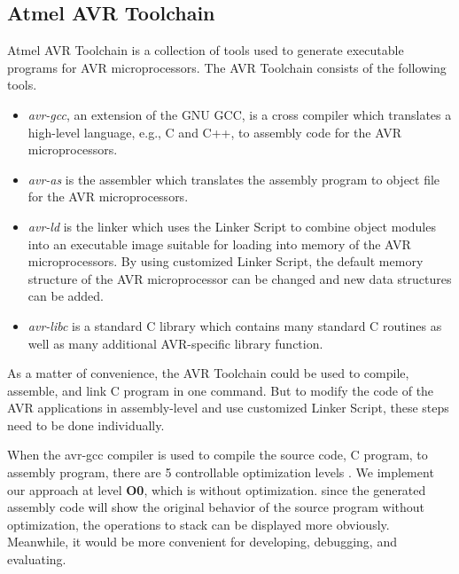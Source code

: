 \subsection{Atmel AVR Toolchain}
Atmel AVR Toolchain is a collection of tools used to generate executable programs for AVR microprocessors. The AVR Toolchain consists of the following tools.

\begin{itemize}

\item \textit{avr-gcc}, an extension of the GNU GCC, is a cross compiler which translates a high-level language, e.g., C and C++, to assembly code for the AVR microprocessors.

\item \textit{avr-as} is the assembler which translates the assembly program to object file for the AVR microprocessors.

\item \textit{avr-ld} is the linker which uses the Linker Script to combine object modules into an executable image suitable for loading into memory of the AVR microprocessors. By using customized Linker Script, the default memory structure of the AVR microprocessor can be changed and new data structures can be added.

\item \textit{avr-libc} is a standard C library which contains many standard C routines as well as many additional AVR-specific library function.

\end{itemize}

As a matter of convenience, the AVR Toolchain could be used to compile, assemble, and link C program in one command. But to modify the code of the AVR applications in assembly-level and use customized Linker Script, these steps need to be done individually.


When the avr-gcc compiler is used to compile the source code, C program, to assembly program, there are 5 controllable optimization levels \cite{hoste2008cole}. We implement our approach at level \textbf{O0}, which is without optimization. since the generated assembly code will show the original behavior of the source program without optimization, the operations to stack can be displayed more obviously. Meanwhile, it would be more convenient for developing, debugging, and evaluating.
